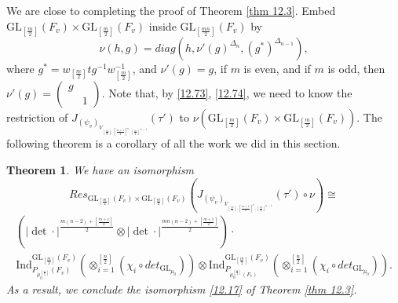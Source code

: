 \documentclass[12pts]{amsart}
\newcommand{\GL}{{\mathrm{GL}}}
\newcommand{\Ind}{{\mathrm{Ind}}}
\newtheorem{thm}{Theorem}[section]
\begin{document}
We are close to completing the proof of Theorem \ref{thm 12.3}. Embed $\GL_{[\frac{m}{2}]}(F_v)\times \GL_{[\frac{m}{2}]}(F_v)$  inside $\GL_{[\frac{mn}{2}]}(F_v)$ by 
$$
\nu(h,g)=diag(h,\nu'(g)^{\Delta_n},(g^*)^{\Delta_{n-1}}),
$$
where $g^*=w_{[\frac{m}{2}]}{}tg^{-1}w^{-1}_{[\frac{m}{2}]}$, and $\nu'(g)=g$, if $m$ is even, and if $m$ is odd, then
 $\nu'(g)=\begin{pmatrix}g\\&1\end{pmatrix}$. Note that, by \eqref{12.73}, \eqref{12.74}, we need to know the restriction of $J_{(\psi_v)_{V_{[\frac{m}{2}],[\frac{m+1}{2}]^n,[\frac{m}{2}]^{n-1}}}}(\tau')$ to $\nu(\GL_{[\frac{m}{2}]}(F_v)\times \GL_{[\frac{m}{2}]}(F_v))$. The following theorem is a corollary of all the work we did in this section.
 \begin{thm}\label{thm 13.9}
 	We have an isomorphism 
 	\begin{equation}\label{13.44}
 	Res_{\GL_{[\frac{m}{2}]}(F_v)\times \GL_{[\frac{m}{2}]}(F_v)}(J_{(\psi_v)_{V_{[\frac{m}{2}],[\frac{m+1}{2}]^n,[\frac{m}{2}]^{n-1}}}}(\tau')\circ \nu)\cong
 	\end{equation}
 	\begin{multline}\nonumber 
 	( |\det\cdot|^{\frac{m(n-2)+[\frac{m+1}{2}]}{2}}\otimes |\det\cdot|^{\frac{mn(n-2)+[\frac{m+1}{2}]}{2}})\cdot\\
 	\Ind_{P_{\mu_0^{[\frac{n}{2}]}}(F_v)}^{\GL_{[\frac{m}{2}]}(F_v)}(\otimes_{i=1}^{[\frac{n}{2}]}(\chi_i\circ det_{\GL_{\mu_0}}))\otimes \Ind_{P_{\mu_0^{[\frac{n}{2}]}(F_v)}}^{\GL_{[\frac{m}{2}]}(F_v)}(\otimes_{i=1}^{[\frac{n}{2}]}(\chi_i\circ det_{\GL_{\mu_0}})).
 	\end{multline}
 As a result, we conclude the isomorphism \eqref{12.17} of Theorem \ref{thm 12.3}. 			
\end{thm}
\end{document}
